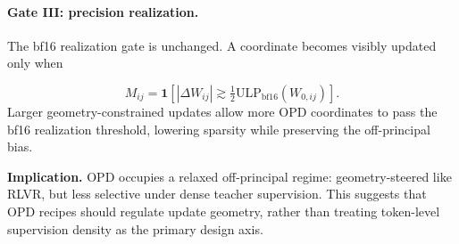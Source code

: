 \paragraph{Gate III: precision realization.}
The bf16 realization gate is unchanged. A coordinate becomes visibly updated only when

\begin{equation}
M_{ij}
=
\mathbf{1}\!\left[
|\Delta W_{ij}|
\gtrsim
\tfrac{1}{2}\mathrm{ULP}_{\mathrm{bf16}}(W_{0,ij})
\right].
\label{eq:bf16_realization_gate}
\end{equation}
Larger geometry-constrained updates allow more OPD coordinates to pass the bf16 realization threshold, lowering sparsity while preserving the
off-principal bias.


\begin{takeawaybox}
\textbf{Implication.}
OPD occupies a relaxed off-principal regime: geometry-steered like RLVR,
but less selective under dense teacher supervision. This suggests that OPD recipes should regulate update geometry, rather than treating token-level supervision density as the primary design axis.
\end{takeawaybox}

